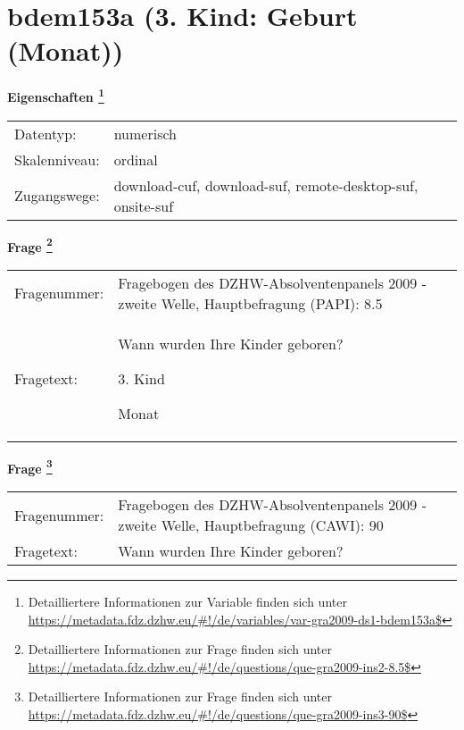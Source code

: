 
    \setcounter{footnote}{0}

    \vspace*{-1.8cm}
	\section{bdem153a (3. Kind: Geburt (Monat))}
	\label{section:bdem153a}



    \vspace*{0.5cm}
    \noindent\textbf{Eigenschaften
	\footnote{Detailliertere Informationen zur Variable finden sich unter
		\url{https://metadata.fdz.dzhw.eu/\#!/de/variables/var-gra2009-ds1-bdem153a$}}}\\
	\begin{tabularx}{\hsize}{@{}lX}
	Datentyp: & numerisch \\
	Skalenniveau: & ordinal \\
	Zugangswege: &
	  download-cuf, 
	  download-suf, 
	  remote-desktop-suf, 
	  onsite-suf
 \\
    \end{tabularx}



				\vspace*{0.5cm}
                \noindent\textbf{Frage
	                \footnote{Detailliertere Informationen zur Frage finden sich unter
		              \url{https://metadata.fdz.dzhw.eu/\#!/de/questions/que-gra2009-ins2-8.5$}}}\\
				\begin{tabularx}{\hsize}{@{}lX}
					Fragenummer: &
					  Fragebogen des DZHW-Absolventenpanels 2009 - zweite Welle, Hauptbefragung (PAPI):
					  8.5
 \\
					Fragetext: & Wann wurden Ihre Kinder geboren?\par  3. Kind\par  Monat \\
				\end{tabularx}
				\vspace*{0.5cm}
                \noindent\textbf{Frage
	                \footnote{Detailliertere Informationen zur Frage finden sich unter
		              \url{https://metadata.fdz.dzhw.eu/\#!/de/questions/que-gra2009-ins3-90$}}}\\
				\begin{tabularx}{\hsize}{@{}lX}
					Fragenummer: &
					  Fragebogen des DZHW-Absolventenpanels 2009 - zweite Welle, Hauptbefragung (CAWI):
					  90
 \\
					Fragetext: & Wann wurden Ihre Kinder geboren? \\
				\end{tabularx}





